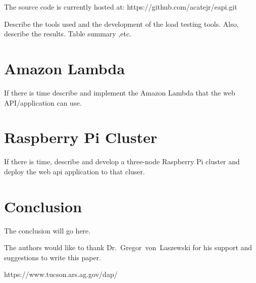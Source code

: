 The source code is currently hosted at: https://github.com/acatejr/eapi.git

Describe the tools used and the development of the load testing tools.  
Also, describe the results.  Table summary ,etc.

\section{Amazon Lambda}
If there is time describe and implement the Amazon Lambda that the web 
API/application can use.

\section{Raspberry Pi Cluster}
If there is time, describe and develop a three-node Raspberry Pi cluster and 
deploy the web api application to that cluser.

\section{Conclusion}
The conclusion will go here.

\begin{acks}

  The authors would like to thank Dr.~Gregor~von~Laszewski for his support and 
  suggestions to write this paper.
  
\end{acks}


 

https://www.tucson.ars.ag.gov/dap/